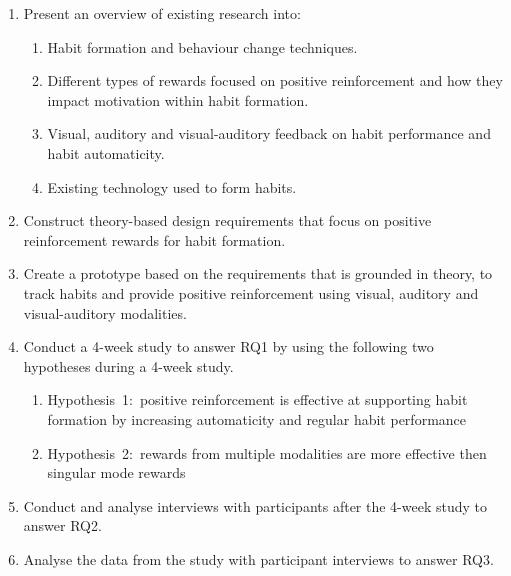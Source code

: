 \begin{enumerate}
    \item Present an overview of existing research into:
      \begin{enumerate}
        \item Habit formation and behaviour change techniques.
        \item Different types of rewards focused on positive reinforcement and how they impact motivation within habit formation.
        \item Visual, auditory and visual-auditory feedback on habit performance and habit automaticity.
        \item Existing technology used to form habits.
      \end{enumerate}
    \item Construct theory-based design requirements that focus on positive reinforcement rewards for habit formation.
    \item Create a prototype based on the requirements that is grounded in theory, to track habits and provide positive reinforcement using visual, auditory and visual-auditory modalities.
    \item Conduct a 4-week study to answer RQ1 by using the following two hypotheses during a 4-week study.
    \begin{enumerate}
        \item Hypothesis~1:~positive reinforcement is effective at supporting habit formation by increasing automaticity and regular habit performance
        \item Hypothesis~2:~rewards from multiple modalities are more effective then singular mode rewards
    \end{enumerate}
    \item Conduct and analyse interviews with participants after the 4-week study to answer RQ2.
    \item Analyse the data from the study with participant interviews to answer RQ3.
\end{enumerate}



